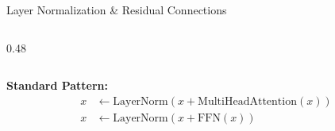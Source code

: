 \documentclass[aspectratio=169]{beamer}
\begin{document}
\begin{frame}[shrink=10]{Layer Normalization \& Residual Connections 🔗}
\begin{columns}[T]
\begin{column}{0.48\textwidth}
\begin{center}
\end{center}
\end{column}
\end{columns}

\vspace{1em}

\textbf{Standard Pattern:}
\begin{align*}
x &\leftarrow \text{LayerNorm}(x + \text{MultiHeadAttention}(x)) \\
x &\leftarrow \text{LayerNorm}(x + \text{FFN}(x))
\end{align*}
\end{frame}
\end{document}

